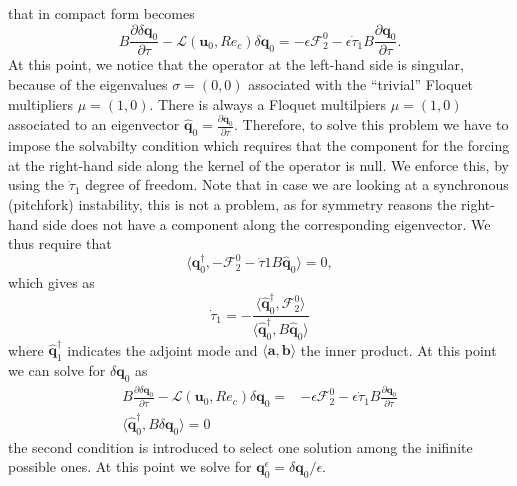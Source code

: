 %
that in compact form becomes
%
\begin{equation}
  B \frac{\partial \delta \bm{q}_0}{\partial \tau} - \mathcal{L}(\bm{u}_0,Re_c) \delta \bm{q}_0 = - \epsilon \mathcal{F}_2^0 - \epsilon \dot{\tau}_1 B \frac{\partial \bm{q}_0}{\partial \tau}.
\end{equation}
%
At this point, we notice that the operator at the left-hand side is singular, because of the eigenvalues $\sigma=(0,0)$ associated with the ``trivial'' Floquet multipliers $\mu = (1,0)$. There is always a Floquet multilpiers $\mu=(1,0)$ associated to an eigenvector $\hat{\bm{q}}_0 = \frac{\partial \bm{q}_0}{\partial \tau}$. Therefore, to solve this problem we have to impose the solvabilty condition which requires that the component for the forcing at the right-hand side along the kernel of the operator is null. We enforce this, by using the $\dot{\tau}_1$ degree of freedom. Note that in case we are looking at a synchronous (pitchfork) instability, this is not a problem, as for symmetry reasons the right-hand side does not have a component along the corresponding eigenvector.
We thus require that
%
\begin{equation}
  \langle \bm{\bm{q}}_0^\dagger, - \mathcal{F}_2^0 - \dot{\tau}1 B \hat{\bm{q}}_0 \rangle = 0,
\end{equation} 
%
which gives as
%
\begin{equation}
  \dot{\tau}_1 = - \frac{ \langle \hat{\bm{q}}_0^\dagger, \mathcal{F}_2^0 \rangle }{ \langle \hat{\bm{q}}_0^\dagger, B \hat{\bm{q}}_0 \rangle}
\end{equation}
%
where $\hat{\bm{q}}_1^\dagger$ indicates the adjoint mode and $\langle \bm{a},\bm{b} \rangle$ the inner product.
%
At this point we can solve for $\delta \bm{q}_0$ as
%
\begin{equation}
  \begin{aligned}
  B \frac{\partial \delta \bm{q}_0}{\partial \tau} - \mathcal{L}(\bm{u}_0,Re_c) \delta \bm{q}_0 = & - \epsilon \mathcal{F}_2^0 - \epsilon \dot{\tau}_1 B \frac{\partial \bm{q}_0}{\partial \tau} \\
  \langle \hat{\bm{q}}_0^\dagger, B \delta \bm{q}_0 \rangle = 0
  \end{aligned}
\end{equation}
%
the second condition is introduced to select one solution among the inifinite possible ones. At this point we solve for $\bm{q}_0^\epsilon  = \delta \bm{q}_0/\epsilon$.


